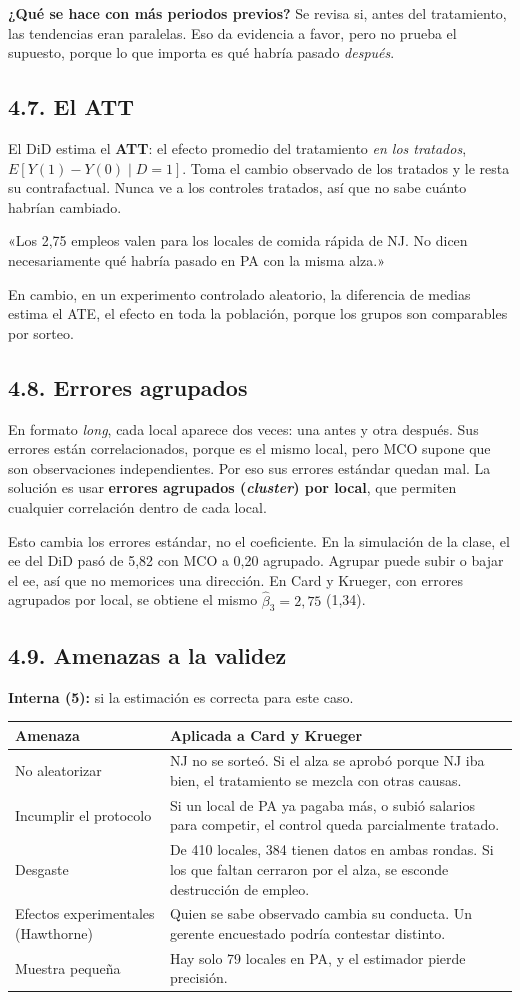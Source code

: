 \documentclass[11pt,letterpaper]{article}
\newcommand{\tema}[1]{\subsection*{#1}}
\begin{document}
\textbf{¿Qué se hace con más periodos previos?} Se revisa si, antes del tratamiento, las tendencias eran paralelas. Eso da evidencia a favor, pero no prueba el supuesto, porque lo que importa es qué habría pasado \emph{después}.

\tema{4.7. El ATT}

El DiD estima el \textbf{ATT}: el efecto promedio del tratamiento \emph{en los tratados}, $E[Y(1)-Y(0)\mid D=1]$. Toma el cambio observado de los tratados y le resta su contrafactual. Nunca ve a los controles tratados, así que no sabe cuánto habrían cambiado.

\begin{frase}
«Los 2,75 empleos valen para los locales de comida rápida de NJ. No dicen necesariamente qué habría pasado en PA con la misma alza.»
\end{frase}

En cambio, en un experimento controlado aleatorio, la diferencia de medias estima el ATE, el efecto en toda la población, porque los grupos son comparables por sorteo.

\tema{4.8. Errores agrupados}

En formato \emph{long}, cada local aparece dos veces: una antes y otra después. Sus errores están correlacionados, porque es el mismo local, pero MCO supone que son observaciones independientes. Por eso sus errores estándar quedan mal. La solución es usar \textbf{errores agrupados (\emph{cluster}) por local}, que permiten cualquier correlación dentro de cada local.

Esto cambia los errores estándar, no el coeficiente. En la simulación de la clase, el ee del DiD pasó de 5,82 con MCO a 0,20 agrupado. Agrupar puede subir o bajar el ee, así que no memorices una dirección. En Card y Krueger, con errores agrupados por local, se obtiene el mismo $\hat\beta_3=2{,}75$ (1,34).

\tema{4.9. Amenazas a la validez}

\textbf{Interna (5):} si la estimación es correcta para este caso.

\begin{center}
\begin{tabular}{p{3.6cm}p{11.2cm}}
\toprule
\textbf{Amenaza} & \textbf{Aplicada a Card y Krueger} \\
\midrule
No aleatorizar & NJ no se sorteó. Si el alza se aprobó porque NJ iba bien, el tratamiento se mezcla con otras causas. \\
Incumplir el protocolo & Si un local de PA ya pagaba más, o subió salarios para competir, el control queda parcialmente tratado. \\
Desgaste & De 410 locales, 384 tienen datos en ambas rondas. Si los que faltan cerraron por el alza, se esconde destrucción de empleo. \\
Efectos experimentales (Hawthorne) & Quien se sabe observado cambia su conducta. Un gerente encuestado podría contestar distinto. \\
Muestra pequeña & Hay solo 79 locales en PA, y el estimador pierde precisión. \\
\bottomrule
\end{tabular}
\end{center}
\end{document}

